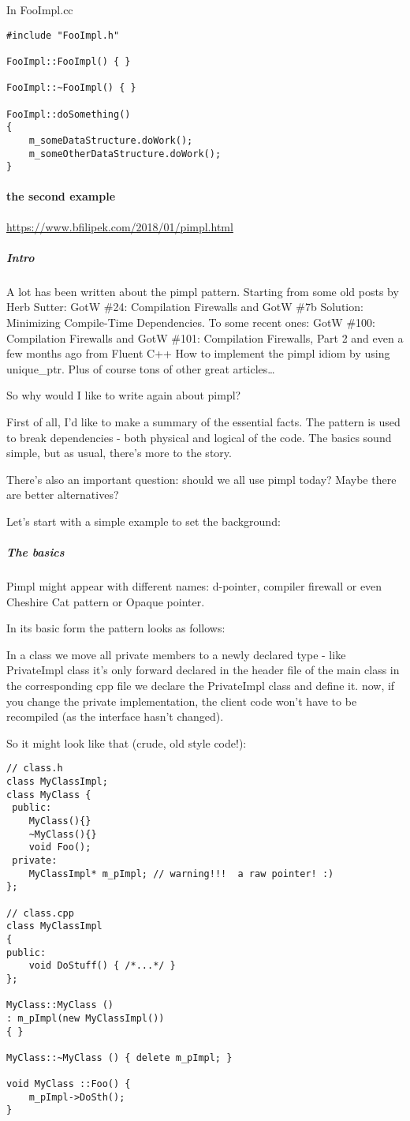 \documentclass{book}
\begin{document}
In FooImpl.cc

\begin{lstlisting}
#include "FooImpl.h"

FooImpl::FooImpl() { }

FooImpl::~FooImpl() { }

FooImpl::doSomething()
{
    m_someDataStructure.doWork();
    m_someOtherDataStructure.doWork();
}
\end{lstlisting}

\paragraph{the second example}
\url{https://www.bfilipek.com/2018/01/pimpl.html}
\subparagraph{Intro}

A lot has been written about the pimpl pattern. Starting from some old posts by Herb Sutter: GotW \#24: Compilation Firewalls and GotW \#7b Solution: Minimizing Compile-Time Dependencies.
To some recent ones: GotW \#100: Compilation Firewalls and GotW \#101: Compilation Firewalls, Part 2 and even a few months ago from Fluent C++ How to implement the pimpl idiom by using unique\_ptr. 
Plus of course tons of other great articles…

So why would I like to write again about pimpl?

First of all, I’d like to make a summary of the essential facts. The pattern is used to break dependencies - both physical and logical of the code.
The basics sound simple, but as usual, there’s more to the story.

There’s also an important question: should we all use pimpl today? Maybe there are better alternatives?

Let’s start with a simple example to set the background:
\subparagraph{The basics}

Pimpl might appear with different names: d-pointer, compiler firewall or even Cheshire Cat pattern or Opaque pointer.

In its basic form the pattern looks as follows:

    In a class we move all private members to a newly declared type - like PrivateImpl class
    it’s only forward declared in the header file of the main class
    in the corresponding cpp file we declare the PrivateImpl class and define it.
    now, if you change the private implementation, the client code won't have to be recompiled (as the interface hasn't changed).

So it might look like that (crude, old style code!):
\begin{lstlisting}
// class.h
class MyClassImpl;
class MyClass {
 public:
    MyClass(){}
    ~MyClass(){}
    void Foo();
 private:    
    MyClassImpl* m_pImpl; // warning!!!  a raw pointer! :)
};

// class.cpp
class MyClassImpl
{
public:
    void DoStuff() { /*...*/ }
};

MyClass::MyClass () 
: m_pImpl(new MyClassImpl()) 
{ }

MyClass::~MyClass () { delete m_pImpl; }

void MyClass ::Foo() {
    m_pImpl->DoSth();
}
\end{lstlisting}
\end{document}
